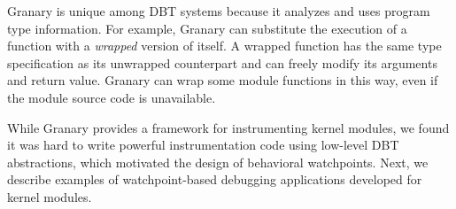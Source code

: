 \documentclass[letterpaper,twocolumn,10pt]{article}
\begin{document}
Granary is unique among DBT systems because it analyzes and uses program type information. For example, Granary can substitute the execution of a function with a \emph{wrapped} version of itself. A wrapped function has the same type specification as its unwrapped counterpart and can freely modify its arguments and return value. Granary can wrap some module functions in this way, even if the module source code is unavailable.

While Granary provides a framework for instrumenting kernel modules, we found it was hard to write powerful instrumentation code using low-level DBT abstractions, which motivated the design of behavioral watchpoints. Next, we describe examples of watchpoint-based debugging applications developed for kernel modules.





\end{document}
